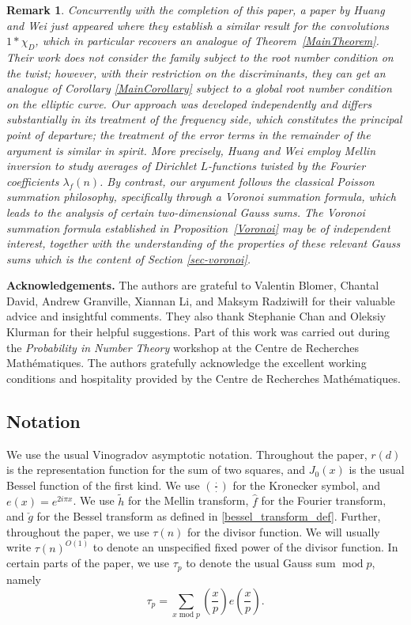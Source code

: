 \documentclass[12pt]{amsart}
\newtheorem{remark}[theorem]{Remark}
\def\mod{\operatorname{mod}}
\begin{document}
\begin{remark}
    Concurrently with the completion of this paper, a paper by Huang and Wei \cite{huang2026momentderivativeslfunctionsnonlinear} just appeared where they establish a similar result for the convolutions $1 * \chi_D$, which in particular recovers an analogue of Theorem~\ref{MainTheorem}. Their work does not consider the family subject to the root number condition on the twist; however, with their restriction on the discriminants, they can get an analogue of Corollary \ref{MainCorollary} subject to a global root number condition on the elliptic curve. Our approach was developed independently and differs substantially in its treatment of the frequency side, which constitutes the principal point of departure; the treatment of the error terms in the remainder of the argument is similar in spirit. More precisely, Huang and Wei employ Mellin inversion to study averages of Dirichlet $L$-functions twisted by the Fourier coefficients $\lambda_f(n)$. By contrast, our argument follows the classical Poisson summation philosophy, specifically through a Voronoi summation formula, which leads to the analysis of certain two-dimensional Gauss sums. The Voronoi summation formula established in Proposition~\ref{Voronoi} may be of independent interest, together with the understanding of the properties of these relevant Gauss sums which is the content of Section \ref{sec-voronoi}.
\end{remark}




\textbf{Acknowledgements.} The authors are grateful to Valentin Blomer, Chantal David, Andrew Granville, Xiannan Li, and Maksym Radziwi\l\l{} for their valuable advice and insightful comments. They also thank Stephanie Chan and Oleksiy Klurman for their helpful suggestions. Part of this work was carried out during the \emph{Probability in Number Theory} workshop at the Centre de Recherches Mathématiques. The authors gratefully acknowledge the excellent working conditions and hospitality provided by the Centre de Recherches Mathématiques.


\subsection{Notation} 
We use the usual Vinogradov asymptotic notation. Throughout the paper, $r(d)$ is the representation function for the sum of two squares, and $J_0(x)$ is the usual Bessel function of the first kind. We use $\left( \frac{\cdot}{\cdot} \right)$ for the Kronecker symbol, and $e(x) = e^{2i\pi x}$. We use $\tilde{h}$ for the Mellin transform, $\hat{f}$ for the Fourier transform, and $\check{g}$ for the Bessel transform as defined in \eqref{bessel_transform_def}. Further, throughout the paper, we use $\tau(n)$ for the divisor function. We will usually write $\tau(n)^{O(1)}$ to denote an unspecified fixed power of the divisor function. In certain parts of the paper, we use $\tau_p$ to denote the usual Gauss sum $\mod p$, namely 
$$ \tau_p =\sum_{x \mod p}\left( \frac{x}{p} \right) e\left( \frac{x}{p} \right) .$$
\end{document}
